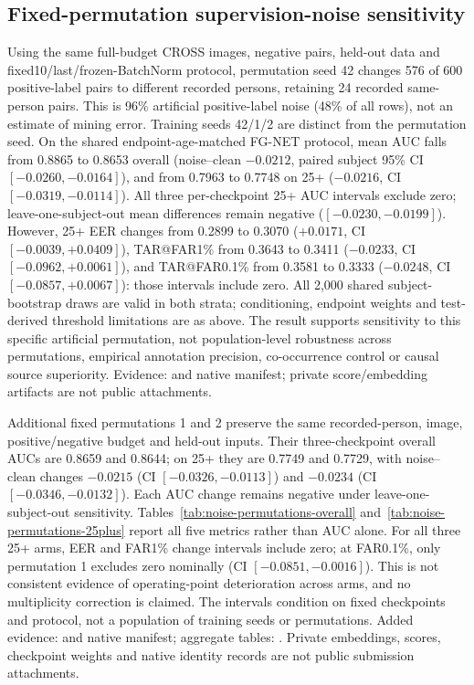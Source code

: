 \documentclass[journal]{IEEEtran}
\begin{document}
\subsection{Fixed-permutation supervision-noise sensitivity}
Using the same full-budget CROSS images, negative pairs, held-out data and
fixed10/last/frozen-BatchNorm protocol, permutation seed 42 changes 576 of 600
positive-label pairs to different recorded persons, retaining 24 recorded same-person pairs.
This is 96\% artificial positive-label noise (48\% of all rows), not an estimate
of mining error. Training seeds 42/1/2 are distinct from the permutation seed.
On the shared endpoint-age-matched FG-NET protocol, mean AUC falls from 0.8865
to 0.8653 overall (noise--clean $-0.0212$, paired subject 95\% CI
$[-0.0260,-0.0164]$), and from 0.7963 to 0.7748 on 25+
($-0.0216$, CI $[-0.0319,-0.0114]$). All three per-checkpoint 25+ AUC
intervals exclude zero; leave-one-subject-out mean differences remain negative
($[-0.0230,-0.0199]$). However, 25+ EER changes from 0.2899 to 0.3070
($+0.0171$, CI $[-0.0039,+0.0409]$), TAR@FAR1\% from 0.3643 to 0.3411
($-0.0233$, CI $[-0.0962,+0.0061]$), and TAR@FAR0.1\% from 0.3581 to 0.3333
($-0.0248$, CI $[-0.0857,+0.0067]$): those intervals include zero.
All 2{,}000 shared subject-bootstrap draws are valid in both strata;
conditioning, endpoint weights and test-derived threshold limitations are
as above. The result supports sensitivity to this specific artificial permutation,
not population-level robustness across permutations, empirical annotation precision, co-occurrence
control or causal source superiority. Evidence:
 and native manifest;
private score/embedding artifacts are not public attachments.

Additional fixed permutations 1 and 2 preserve the same recorded-person, image,
positive/negative budget and held-out inputs. Their three-checkpoint overall AUCs
are 0.8659 and 0.8644; on 25+ they are 0.7749 and 0.7729, with noise--clean
changes $-0.0215$ (CI $[-0.0326,-0.0113]$) and $-0.0234$
(CI $[-0.0346,-0.0132]$). Each AUC change remains negative under
leave-one-subject-out sensitivity. Tables~\ref{tab:noise-permutations-overall}
and~\ref{tab:noise-permutations-25plus} report all five metrics rather than AUC alone.
For all three 25+ arms, EER and FAR1\% change intervals include zero; at FAR0.1\%,
only permutation 1 excludes zero nominally (CI $[-0.0851,-0.0016]$).
This is not consistent evidence of operating-point deterioration across arms,
and no multiplicity correction is claimed. The intervals condition on fixed
checkpoints and protocol, not a population of training seeds or permutations.
Added evidence: 
and native manifest; aggregate tables:
.
Private embeddings, scores, checkpoint weights and native identity records are
not public submission attachments.
\end{document}
